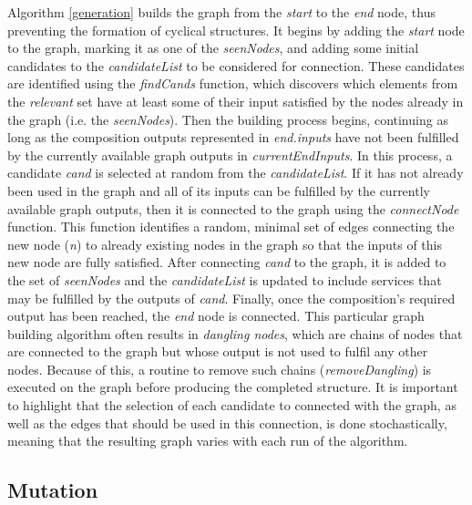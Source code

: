 \documentclass{article}
\begin{document}
Algorithm \ref{generation} builds the graph from the \textit{start} to the \textit{end} node, thus preventing the formation of cyclical
structures. It begins by adding the \textit{start} node to the graph, marking it as one of the
\textit{seenNodes}, and adding some initial candidates to the \textit{candidateList} to be considered for connection. These candidates
are identified using the \textit{findCands} function, which discovers which elements from the \textit{relevant} set have at least some
of their input satisfied by the nodes already in the graph (i.e. the \textit{seenNodes}). Then the building process begins, continuing
as long as the composition outputs represented in \textit{end.inputs} have not been fulfilled by the currently available graph outputs
in \textit{currentEndInputs}. In this process, a candidate \textit{cand} is selected at random from the \textit{candidateList}. If
it has not already been used in the graph and all of its inputs can be fulfilled by the currently available graph outputs, then it is
connected to the graph using the \textit{connectNode} function. This function identifies a random, minimal set of edges connecting the
new node (\textit{n}) to already existing nodes in the graph so that the inputs of this new node are fully satisfied. After connecting
\textit{cand} to the graph, it is added to the set of \textit{seenNodes} and the \textit{candidateList} is updated to include services
that may be fulfilled by the outputs of \textit{cand}. Finally, once the composition's required output has been reached, the \textit{end}
node is connected. This particular graph building algorithm often results in \textit{dangling nodes}, which are chains of nodes that are
connected to the graph but whose output is not used to fulfil any other nodes. Because of this, a routine to remove such chains (\textit{removeDangling})
is executed on the graph before producing the completed structure. It is important to highlight that the selection of each candidate
to connected with the graph, as well as the edges that should be used in this connection, is done stochastically, meaning that the
resulting graph varies with each run of the algorithm.

\subsection{Mutation}
\end{document}
